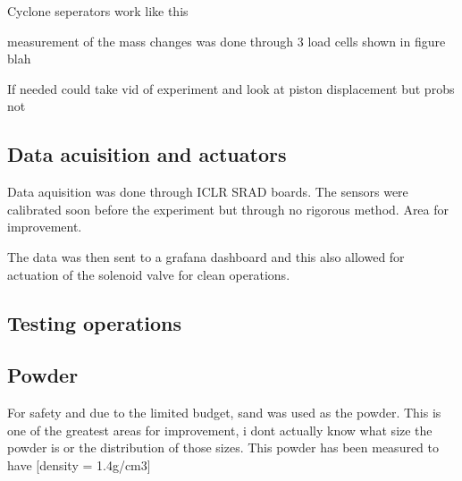 Cyclone seperators work like this

measurement of the mass changes was done through 3 load cells shown in figure blah

If needed could take vid of experiment and look at piston displacement but probs not

\subsection{Data acuisition and actuators}
Data aquisition was done through ICLR SRAD boards. The sensors were calibrated soon before the experiment but through no rigorous method. Area for improvement.

The data was then sent to a grafana dashboard and this also allowed for actuation of the solenoid valve for clean operations.

\newpage
\subsection{Testing operations}

\subsection{Powder}
For safety and due to the limited budget, sand was used as the powder. This is one of the greatest areas for improvement, i dont actually know what size the powder is or the distribution of those sizes. This powder has been measured to have [density = 1.4g/cm3]

\newpage
